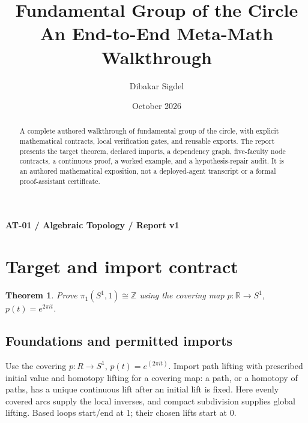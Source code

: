 \documentclass[preprint,12pt,aps,pra,showkeys,amsmath,amssymb,superscriptaddress,floatfix]{revtex4-2}
\newtheorem{theorem}{Theorem}[section]
\theoremstyle{definition}
\theoremstyle{remark}
\begin{document}
\title{Fundamental Group of the Circle\\[4pt]\large An End-to-End Meta-Math Walkthrough}

\author{Dibakar Sigdel}


\date{October 2026}

\begin{abstract}

A complete authored walkthrough of fundamental group of the circle, with
explicit mathematical contracts, local verification gates, and reusable
exports. The report presents the target theorem, declared imports, a
dependency graph, five-faculty node contracts, a continuous proof, a
worked example, and a hypothesis-repair audit. It is an authored
mathematical exposition, not a deployed-agent transcript or a formal
proof-assistant certificate.

\end{abstract}\maketitle\linespread{1.12}\selectfont

\noindent\textbf{AT-01 / Algebraic Topology / Report v1}

\section{Target and import contract}

\begin{theorem}

Prove \(\pi_1(S^1,1)\cong\mathbb Z\) using the covering map
\(p:\mathbb R\to S^1\), \(p(t)=e^{2\pi it}\).

\end{theorem}

\subsection{Foundations and permitted imports}

Use the covering \(p:R\to S^{1}\), \(p(t)=e^{(2\pi it)}\). Import path
lifting with prescribed initial value and homotopy lifting for a
covering map: a path, or a homotopy of paths, has a unique continuous
lift after an initial lift is fixed. Here evenly covered arcs supply the
local inverses, and compact subdivision supplies global lifting. Based
loops start/end at 1; their chosen lifts start at 0.
\end{document}
